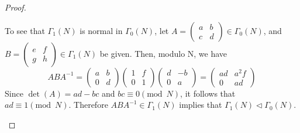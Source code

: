 \documentclass[10pt]{amsart}
\begin{document}
\begin{thm}
\begin{proof}
\begin{enumerate}[(a)]
      To see that $\Gamma_1(N)$ is normal in $\Gamma_0(N)$, let $A = \left(
      \begin{array}{cc}
	a & b\\
	c & d
      \end{array}
      \right) \in \Gamma_0(N)$, and
      $B = \left(
      \begin{array}{cc}
	e & f\\
	g & h
      \end{array}
      \right) \in \Gamma_1(N)$
      be given.
      Then, modulo N, we have
      $$ABA^{-1} = \left(
      \begin{array}{cc}
	a & b\\
	0 & d
      \end{array}
      \right)
      \left(
      \begin{array}{cc}
	1 & f\\
	0 & 1
      \end{array}
      \right)
      \left(
      \begin{array}{cc}
	d & -b\\
	0 & a
      \end{array}
      \right) = 
      \left(
      \begin{array}{cc}
	ad & a^2f\\
	0 & ad
      \end{array}
      \right)
      $$
      Since $\det(A) = ad - bc$ and $bc \equiv 0 (\text{mod }\, N)$, it follows that $ad \equiv 1 (\text{mod }\, N)$.
      Therefore $ABA^{-1} \in \Gamma_1(N)$ implies that $\Gamma_1(N) \lhd \Gamma_0(N)$.
      

\end{enumerate}
\end{proof}
\end{thm}
\end{document}
